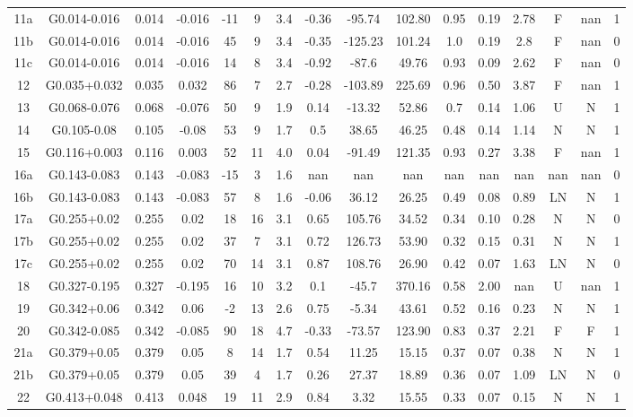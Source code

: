 \begin{table}
\begin{tabular}{cccccccccccccccc}
11a & G0.014-0.016 & 0.014 & -0.016 & -11 & 9 & 3.4 & -0.36 & -95.74 & 102.80 & 0.95 & 0.19 & 2.78 & F & nan & 1 \\
11b & G0.014-0.016 & 0.014 & -0.016 & 45 & 9 & 3.4 & -0.35 & -125.23 & 101.24 & 1.0 & 0.19 & 2.8 & F & nan & 0 \\
11c & G0.014-0.016 & 0.014 & -0.016 & 14 & 8 & 3.4 & -0.92 & -87.6 & 49.76 & 0.93 & 0.09 & 2.62 & F & nan & 0 \\
12 & G0.035+0.032 & 0.035 & 0.032 & 86 & 7 & 2.7 & -0.28 & -103.89 & 225.69 & 0.96 & 0.50 & 3.87 & F & nan & 1 \\
13 & G0.068-0.076 & 0.068 & -0.076 & 50 & 9 & 1.9 & 0.14 & -13.32 & 52.86 & 0.7 & 0.14 & 1.06 & U & N & 1 \\
14 & G0.105-0.08 & 0.105 & -0.08 & 53 & 9 & 1.7 & 0.5 & 38.65 & 46.25 & 0.48 & 0.14 & 1.14 & N & N & 1 \\
15 & G0.116+0.003 & 0.116 & 0.003 & 52 & 11 & 4.0 & 0.04 & -91.49 & 121.35 & 0.93 & 0.27 & 3.38 & F & nan & 1 \\
16a & G0.143-0.083 & 0.143 & -0.083 & -15 & 3 & 1.6 & nan & nan & nan & nan & nan & nan & nan & nan & 0 \\
16b & G0.143-0.083 & 0.143 & -0.083 & 57 & 8 & 1.6 & -0.06 & 36.12 & 26.25 & 0.49 & 0.08 & 0.89 & LN & N & 1 \\
17a & G0.255+0.02 & 0.255 & 0.02 & 18 & 16 & 3.1 & 0.65 & 105.76 & 34.52 & 0.34 & 0.10 & 0.28 & N & N & 0 \\
17b & G0.255+0.02 & 0.255 & 0.02 & 37 & 7 & 3.1 & 0.72 & 126.73 & 53.90 & 0.32 & 0.15 & 0.31 & N & N & 1 \\
17c & G0.255+0.02 & 0.255 & 0.02 & 70 & 14 & 3.1 & 0.87 & 108.76 & 26.90 & 0.42 & 0.07 & 1.63 & LN & N & 0 \\
18 & G0.327-0.195 & 0.327 & -0.195 & 16 & 10 & 3.2 & 0.1 & -45.7 & 370.16 & 0.58 & 2.00 & nan & U & nan & 1 \\
19 & G0.342+0.06 & 0.342 & 0.06 & -2 & 13 & 2.6 & 0.75 & -5.34 & 43.61 & 0.52 & 0.16 & 0.23 & N & N & 1 \\
20 & G0.342-0.085 & 0.342 & -0.085 & 90 & 18 & 4.7 & -0.33 & -73.57 & 123.90 & 0.83 & 0.37 & 2.21 & F & F & 1 \\
21a & G0.379+0.05 & 0.379 & 0.05 & 8 & 14 & 1.7 & 0.54 & 11.25 & 15.15 & 0.37 & 0.07 & 0.38 & N & N & 1 \\
21b & G0.379+0.05 & 0.379 & 0.05 & 39 & 4 & 1.7 & 0.26 & 27.37 & 18.89 & 0.36 & 0.07 & 1.09 & LN & N & 0 \\
22 & G0.413+0.048 & 0.413 & 0.048 & 19 & 11 & 2.9 & 0.84 & 3.32 & 15.55 & 0.33 & 0.07 & 0.15 & N & N & 1 \\

\end{tabular}
\end{table}
